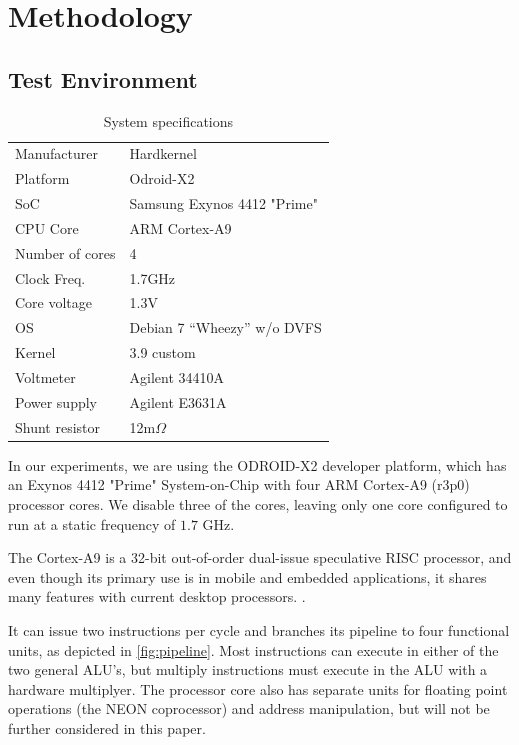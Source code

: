 \section{Methodology}


\subsection{Test Environment}
\begin{table}
    \begin{tabular}{l|l}
        \hline
        \hline
    Manufacturer	&Hardkernel\\
Platform	&Odroid-X2\\
SoC	&Samsung Exynos 4412 "Prime"\\
CPU Core	&ARM Cortex-A9\\
Number of cores	&4\\
Clock Freq.	&1.7GHz\\
Core voltage	&1.3V\\
OS	&Debian 7 “Wheezy” w/o DVFS\\
Kernel	&3.9 custom\\
        \hline
        \hline
        Voltmeter   &Agilent 34410A\\
        Power supply &Agilent E3631A\\
        Shunt resistor &12m$\Omega$
    \end{tabular}
    \caption{System specifications}
\end{table}
In our experiments, we are using the ODROID-X2 \cite{odroid-x2} developer
platform, which has an Exynos 4412 "Prime" System-on-Chip with four ARM
Cortex-A9 (r3p0) processor cores. We disable three of the cores, leaving only
one core configured to run at a static frequency of $1.7$ GHz.

The Cortex-A9 is a 32-bit out-of-order dual-issue speculative RISC processor,
and even though its primary use is in mobile and embedded applications, it
shares many features with current desktop processors. \cite{patterson}
\cite{hennessy}.

It can issue two instructions per cycle and branches its pipeline to four
functional units, as depicted in \autoref{fig:pipeline}. Most instructions can
execute in either of the two general ALU's, but multiply instructions must
execute in the ALU with a hardware multiplyer. The processor core also has
separate units for floating point operations (the NEON coprocessor) and address
manipulation, but will not be further considered in this paper.

